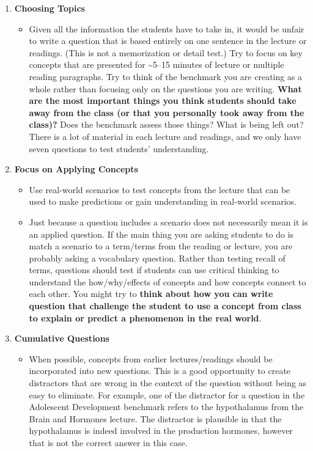 \documentclass[
]{article}
\providecommand{\tightlist}{%
  \setlength{\itemsep}{0pt}\setlength{\parskip}{0pt}}
\begin{document}
\begin{enumerate}
\def\labelenumi{\arabic{enumi}.}
\tightlist
\item
  \textbf{Choosing Topics}

  \begin{itemize}
  \tightlist
  \item
    Given all the information the students have to take in, it would be unfair to write a question that is based entirely on one sentence in the lecture or readings. (This is not a memorization or detail test.) Try to focus on key concepts that are presented for \textasciitilde5--15 minutes of lecture or multiple reading paragraphs. Try to think of the benchmark you are creating as a whole rather than focusing only on the questions you are writing. \textbf{What are the most important things you think students should take away from the class (or that you personally took away from the class)?} Does the benchmark assess those things? What is being left out? There is a lot of material in each lecture and readings, and we only have seven questions to test students' understanding.
  \end{itemize}
\item
  \textbf{Focus on Applying Concepts}

  \begin{itemize}
  \tightlist
  \item
    Use real-world scenarios to test concepts from the lecture that can be used to make predictions or gain understanding in real-world scenarios.
  \item
    Just because a question includes a scenario does not necessarily mean it is an applied question. If the main thing you are asking students to do is match a scenario to a term/terms from the reading or lecture, you are probably asking a vocabulary question. Rather than testing recall of terms, questions should test if students can use critical thinking to understand the how/why/effects of concepts and how concepts connect to each other. You might try to \textbf{think about how you can write question that challenge the student to use a concept from class to explain or predict a phenomenon in the real world}.
  \end{itemize}
\item
  \textbf{Cumulative Questions}

  \begin{itemize}
  \tightlist
  \item
    When possible, concepts from earlier lectures/readings should be incorporated into new questions. This is a good opportunity to create distractors that are wrong in the context of the question without being as easy to eliminate. For example, one of the distractor for a question in the Adolescent Development benchmark refers to the hypothalamus from the Brain and Hormones lecture. The distractor is plausible in that the hypothalamus is indeed involved in the production hormones, however that is not the correct answer in this case.
  \end{itemize}
\end{enumerate}
\end{document}
